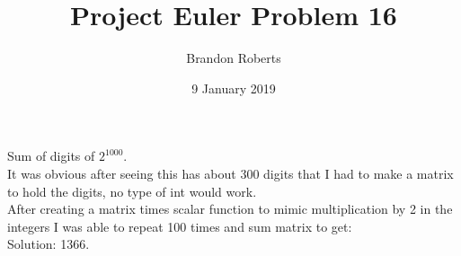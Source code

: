 \documentclass{article}
\begin{document}
\title{Project Euler Problem 16}
\author{Brandon Roberts}
\date{9 January 2019}

\maketitle

Sum of digits of $2^{1000}$.\\
It was obvious after seeing this has about 300 digits that I had to make a matrix to hold the digits, no type of int would work.\\
After creating a matrix times scalar function to mimic multiplication by 2 in the integers I was able to repeat 100 times and sum matrix to get:\\
Solution: 1366.
\end{document}
